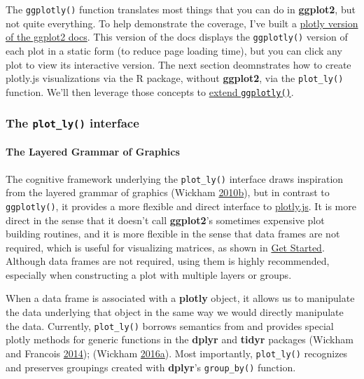 \documentclass[12pt,]{isuthesis}
\let\oldparagraph\paragraph
\renewcommand{\paragraph}[1]{\oldparagraph{#1}\mbox{}}
\begin{document}
The \texttt{ggplotly()} function translates most things that you can do
in \textbf{ggplot2}, but not quite everything. To help demonstrate the
coverage, I've built a
\href{http://ropensci.github.io/plotly/ggplot2}{plotly version of the
ggplot2 docs}. This version of the docs displays the \texttt{ggplotly()}
version of each plot in a static form (to reduce page loading time), but
you can click any plot to view its interactive version. The next section
deomnstrates how to create plotly.js visualizations via the R package,
without \textbf{ggplot2}, via the \texttt{plot\_ly()} function. We'll
then leverage those concepts to
\protect\hyperlink{extending-ggplotly}{extend \texttt{ggplotly()}}.

\subsubsection{\texorpdfstring{The \texttt{plot\_ly()}
interface}{The plot\_ly() interface}}\label{the-plot_ly-interface}

\hypertarget{the-layered-grammar-of-graphics}{\paragraph{The Layered
Grammar of Graphics}\label{the-layered-grammar-of-graphics}}

The cognitive framework underlying the \texttt{plot\_ly()} interface
draws inspiration from the layered grammar of graphics (Wickham
\protect\hyperlink{ref-Wickham:2010hya}{2010}\protect\hyperlink{ref-Wickham:2010hya}{b}),
but in contrast to \texttt{ggplotly()}, it provides a more flexible and
direct interface to
\href{https://github.com/plotly/plotly.js}{plotly.js}. It is more direct
in the sense that it doesn't call \textbf{ggplot2}'s sometimes expensive
plot building routines, and it is more flexible in the sense that data
frames are not required, which is useful for visualizing matrices, as
shown in \protect\hyperlink{get-started}{Get Started}. Although data
frames are not required, using them is highly recommended, especially
when constructing a plot with multiple layers or groups.

When a data frame is associated with a \textbf{plotly} object, it allows
us to manipulate the data underlying that object in the same way we
would directly manipulate the data. Currently, \texttt{plot\_ly()}
borrows semantics from and provides special plotly methods for generic
functions in the \textbf{dplyr} and \textbf{tidyr} packages (Wickham and
Francois \protect\hyperlink{ref-dplyr}{2014}); (Wickham
\protect\hyperlink{ref-tidyr}{2016}\protect\hyperlink{ref-tidyr}{a}).
Most importantly, \texttt{plot\_ly()} recognizes and preserves groupings
created with \textbf{dplyr}'s \texttt{group\_by()} function.
\end{document}
